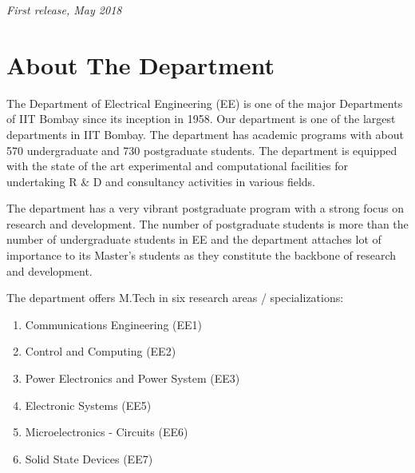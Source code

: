 \documentclass[11pt,fleqn]{book} %
\begin{document}
\noindent \textit{First release, May 2018} %



\pagestyle{empty} %

\tableofcontents %


\pagestyle{fancy} %



\chapter{About The Department}

The Department of Electrical Engineering (EE) is one of the major Departments of IIT Bombay since its inception in 1958. Our department is one of the largest departments in IIT Bombay.
The department has academic programs with about 570 undergraduate and 730 postgraduate students. The department is equipped with the state of the art experimental and computational facilities for undertaking R \& D and consultancy activities in various fields.\par
The department has a very vibrant postgraduate program with a strong focus on research and
development. The number of postgraduate students is more than the number of undergraduate
students in EE and the department attaches lot of importance to its Master's students as they constitute the backbone of research and development.\par
 
The department offers M.Tech in six research areas / specializations:

\begin{enumerate}
	\item   Communications Engineering (EE1)
	\item	Control and Computing (EE2)
	\item	Power Electronics and Power System (EE3)
	\item	Electronic Systems (EE5)
	\item	Microelectronics - Circuits (EE6)
	\item	Solid State Devices (EE7)
\end{enumerate}
\end{document}
